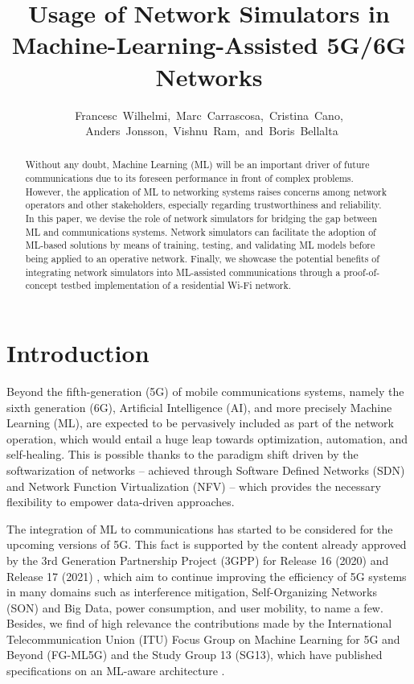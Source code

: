 \documentclass{article}
\begin{document}
	\title{Usage of Network Simulators in \\Machine-Learning-Assisted 5G/6G Networks}
	\author{Francesc~Wilhelmi,~Marc~Carrascosa,~Cristina~Cano,\\~Anders~Jonsson,~Vishnu~Ram,~and~Boris~Bellalta}
	\date{ }
	\maketitle
	
	\begin{abstract}
		Without any doubt, Machine Learning (ML) will be an important driver of future communications due to its foreseen performance in front of complex problems. However, the application of ML to networking systems raises concerns among network operators and other stakeholders, especially regarding trustworthiness and reliability. In this paper, we devise the role of network simulators for bridging the gap between ML and communications systems. Network simulators can facilitate the adoption of ML-based solutions by means of training, testing, and validating ML models before being applied to an operative network. Finally, we showcase the potential benefits of integrating network simulators into ML-assisted communications through a proof-of-concept testbed implementation of a residential Wi-Fi network. 
	\end{abstract}
	
	\section{Introduction}
	Beyond the fifth-generation (5G) of mobile communications systems, namely the sixth generation (6G), Artificial Intelligence (AI), and more precisely Machine Learning (ML), are expected to be pervasively included as part of the network operation, which would entail a huge leap towards optimization, automation, and self-healing. This is possible thanks to the paradigm shift driven by the softwarization of networks -- achieved through Software Defined Networks (SDN) and Network Function Virtualization (NFV) -- which provides the necessary flexibility to empower data-driven approaches.
	
	The integration of ML to communications has started to be considered for the upcoming versions of 5G. This fact is supported by the content already approved by the 3rd Generation Partnership Project (3GPP) for Release 16 (2020) and Release 17 (2021) \cite{3gpp2019study}, which aim to continue improving the efficiency of 5G systems in many domains such as interference mitigation, Self-Organizing Networks (SON) and Big Data, power consumption, and user mobility, to name a few. Besides, we find of high relevance the contributions made by the International Telecommunication Union (ITU) Focus Group on Machine Learning for 5G and Beyond (FG-ML5G) and the Study Group 13 (SG13), which have published specifications on an ML-aware architecture \cite{ITU3172, ITU3174}.
	
\end{document}
